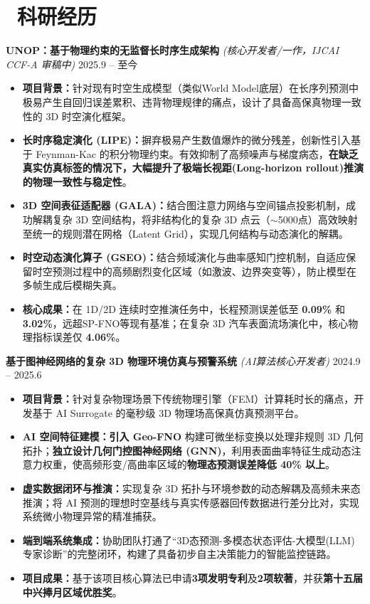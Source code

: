 \documentclass[11pt]{article}
\newlength{\interProjectSpacing}
\newcommand{\projectsep}{\vspace{\interProjectSpacing}}
\begin{document}
\section{\makebox[\widthof{\faUsers}][c]{\color{CVBlue}\faUsers}\ 科研经历}

\textbf{UNOP：基于物理约束的无监督长时序生成架构} \textit{(核心开发者/一作，IJCAI CCF-A 审稿中)} \hfill 2025.9 -- 至今
\begin{itemize}
    \item \textbf{项目背景：}针对现有时空生成模型（类似World Model底层）在长序列预测中极易产生自回归误差累积、违背物理规律的痛点，设计了具备高保真物理一致性的 3D 时空演化框架。
    \item \textbf{长时序稳定演化 (LIPE)：}摒弃极易产生数值爆炸的微分残差，创新性引入基于 Feynman-Kac 的积分物理约束。有效抑制了高频噪声与梯度病态，\textbf{在缺乏真实仿真标签的情况下，大幅提升了极端长视距(Long-horizon rollout)推演的物理一致性与稳定性}。
    \item \textbf{3D 空间表征适配器 (GALA)：}结合图注意力网络与空间锚点投影机制，成功解耦复杂 3D 空间结构，将非结构化的复杂 3D 点云（$\sim$5000点）高效映射至统一的规则潜在网格（Latent Grid），实现几何结构与动态演化的解耦。
    \item \textbf{时空动态演化算子 (GSEO)：}结合频域演化与曲率感知门控机制，自适应保留时空预测过程中的高频剧烈变化区域（如激波、边界突变等），防止模型在多帧生成后模糊失真。
    \item \textbf{核心成果：}在 1D/2D 连续时空推演任务中，长程预测误差低至 \textbf{0.09\%} 和 \textbf{3.02\%}，远超SP-FNO等现有基准；在复杂 3D 汽车表面流场演化中，核心物理指标误差仅 \textbf{4.06\%}。
\end{itemize}

\projectsep

\textbf{基于图神经网络的复杂 3D 物理环境仿真与预警系统} \textit{(AI算法核心开发者)} \hfill 2024.9 -- 2025.6
\begin{itemize}
    \item \textbf{项目背景：}针对复杂物理场景下传统物理引擎（FEM）计算耗时长的痛点，开发基于 AI Surrogate 的毫秒级 3D 物理场高保真仿真预测平台。
    \item \textbf{AI 空间特征建模：}\textbf{引入 Geo-FNO} 构建可微坐标变换以处理非规则 3D 几何拓扑；\textbf{独立设计几何门控图神经网络 (GNN)}，利用表面曲率特征生成动态注意力权重，使高频形变/高曲率区域的\textbf{物理态预测误差降低 40\% 以上}。
    \item \textbf{虚实数据闭环与推演：}实现复杂 3D 拓扑与环境参数的动态解耦及高频未来态推演；将 AI 预测的理想时空基线与真实传感器回传数据进行差分比对，实现系统微小物理异常的精准捕获。
    \item \textbf{端到端系统集成：}协助团队打通了“3D态预测-多模态状态评估-大模型(LLM)专家诊断”的完整闭环，构建了具备初步自主决策能力的智能监控链路。
    \item \textbf{项目成果：}基于该项目核心算法已申请\textbf{3项发明专利}及\textbf{2项软著}，并获\textbf{第十五届中兴捧月区域优胜奖}。
\end{itemize}
\end{document}
